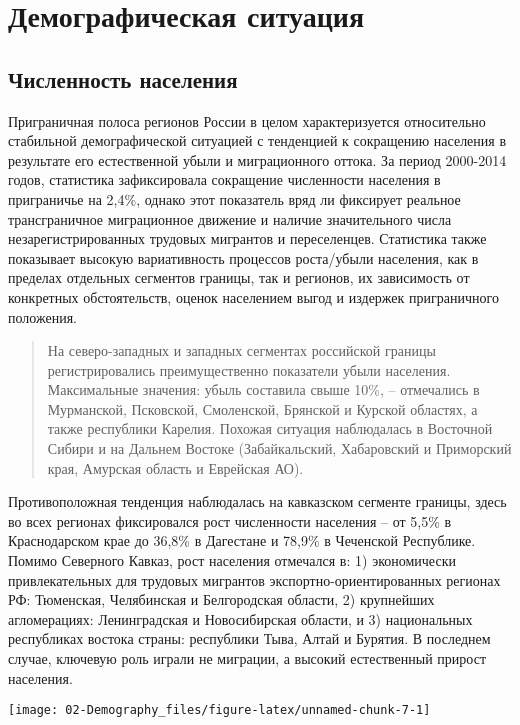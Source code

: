 \documentclass[]{book}
\begin{document}
\section{Демографическая ситуация}\label{demo-situ}

\subsection{Численность населения}\label{demo-situ-pop}

Приграничная полоса регионов России в целом характеризуется относительно
стабильной демографической ситуацией с тенденцией к сокращению населения
в результате его естественной убыли и миграционного оттока. За период
2000-2014 годов, статистика зафиксировала сокращение численности
населения в приграничье на 2,4\%, однако этот показатель вряд ли
фиксирует реальное трансграничное миграционное движение и наличие
значительного числа незарегистрированных трудовых мигрантов и
переселенцев. Статистика также показывает высокую вариативность
процессов роста/убыли населения, как в пределах отдельных сегментов
границы, так и регионов, их зависимость от конкретных обстоятельств,
оценок населением выгод и издержек приграничного положения.

\begin{quote}
На северо-западных и западных сегментах российской границы
регистрировались преимущественно показатели убыли населения.
Максимальные значения: убыль составила свыше 10\%, -- отмечались в
Мурманской, Псковской, Смоленской, Брянской и Курской областях, а также
республики Карелия. Похожая ситуация наблюдалась в Восточной Сибири и на
Дальнем Востоке (Забайкальский, Хабаровский и Приморский края, Амурская
область и Еврейская АО).
\end{quote}

Противоположная тенденция наблюдалась на кавказском сегменте границы,
здесь во всех регионах фиксировался рост численности населения -- от
5,5\% в Краснодарском крае до 36,8\% в Дагестане и 78,9\% в Чеченской
Республике. Помимо Северного Кавказ, рост населения отмечался в: 1)
экономически привлекательных для трудовых мигрантов
экспортно-ориентированных регионах РФ: Тюменская, Челябинская и
Белгородская области, 2) крупнейших агломерациях: Ленинградская и
Новосибирская области, и 3) национальных республиках востока страны:
республики Тыва, Алтай и Бурятия. В последнем случае, ключевую роль
играли не миграции, а высокий естественный прирост населения.

\texttt{[image: 02-Demography\_files/figure-latex/unnamed-chunk-7-1]}
\end{document}

